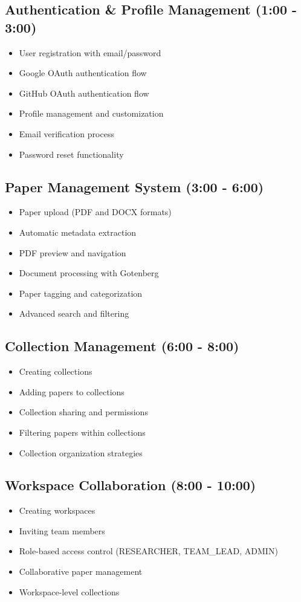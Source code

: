 \subsection{Authentication \& Profile Management (1:00 - 3:00)}
\begin{itemize}[leftmargin=*]
    \item User registration with email/password
    \item Google OAuth authentication flow
    \item GitHub OAuth authentication flow
    \item Profile management and customization
    \item Email verification process
    \item Password reset functionality
\end{itemize}

\subsection{Paper Management System (3:00 - 6:00)}
\begin{itemize}[leftmargin=*]
    \item Paper upload (PDF and DOCX formats)
    \item Automatic metadata extraction
    \item PDF preview and navigation
    \item Document processing with Gotenberg
    \item Paper tagging and categorization
    \item Advanced search and filtering
\end{itemize}

\subsection{Collection Management (6:00 - 8:00)}
\begin{itemize}[leftmargin=*]
    \item Creating collections
    \item Adding papers to collections
    \item Collection sharing and permissions
    \item Filtering papers within collections
    \item Collection organization strategies
\end{itemize}

\subsection{Workspace Collaboration (8:00 - 10:00)}
\begin{itemize}[leftmargin=*]
    \item Creating workspaces
    \item Inviting team members
    \item Role-based access control (RESEARCHER, TEAM\_LEAD, ADMIN)
    \item Collaborative paper management
    \item Workspace-level collections
\end{itemize}

